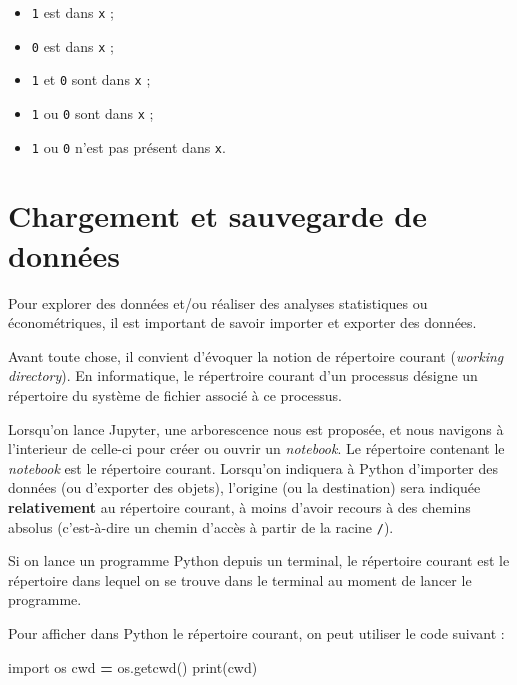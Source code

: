 \documentclass[12pt,]{book}
\newenvironment{Shaded}{\begin{snugshade}}{\end{snugshade}}
\newcommand{\ImportTok}[1]{#1}
\newcommand{\OperatorTok}[1]{\textcolor[rgb]{0.81,0.36,0.00}{\textbf{#1}}}
\newcommand{\BuiltInTok}[1]{#1}
\newcommand{\NormalTok}[1]{#1}
\providecommand{\tightlist}{%
  \setlength{\itemsep}{0pt}\setlength{\parskip}{0pt}}
\numberwithin{equation}{section}
\numberwithin{countremarque}{section}
\begin{document}
\begin{itemize}
\tightlist
\item
  \texttt{1} est dans \texttt{x} ;
\item
  \texttt{0} est dans \texttt{x} ;
\item
  \texttt{1} et \texttt{0} sont dans \texttt{x} ;
\item
  \texttt{1} ou \texttt{0} sont dans \texttt{x} ;
\item
  \texttt{1} ou \texttt{0} n'est pas présent dans \texttt{x}.
\end{itemize}

\chapter{Chargement et sauvegarde de
données}\label{chargement-et-sauvegarde-de-donnees}

Pour explorer des données et/ou réaliser des analyses statistiques ou
économétriques, il est important de savoir importer et exporter des
données.

Avant toute chose, il convient d'évoquer la notion de répertoire courant
(\emph{working directory}). En informatique, le répertroire courant d'un
processus désigne un répertoire du système de fichier associé à ce
processus.

Lorsqu'on lance Jupyter, une arborescence nous est proposée, et nous
navigons à l'interieur de celle-ci pour créer ou ouvrir un
\emph{notebook}. Le répertoire contenant le \emph{notebook} est le
répertoire courant. Lorsqu'on indiquera à Python d'importer des données
(ou d'exporter des objets), l'origine (ou la destination) sera indiquée
\textbf{relativement} au répertoire courant, à moins d'avoir recours à
des chemins absolus (c'est-à-dire un chemin d'accès à partir de la
racine \texttt{/}).

Si on lance un programme Python depuis un terminal, le répertoire
courant est le répertoire dans lequel on se trouve dans le terminal au
moment de lancer le programme.

Pour afficher dans Python le répertoire courant, on peut utiliser le
code suivant :

\begin{Shaded}
\begin{Highlighting}[]
\ImportTok{import}\NormalTok{ os}
\NormalTok{cwd }\OperatorTok{=}\NormalTok{ os.getcwd()}
\BuiltInTok{print}\NormalTok{(cwd)}
\end{Highlighting}
\end{Shaded}
\end{document}
